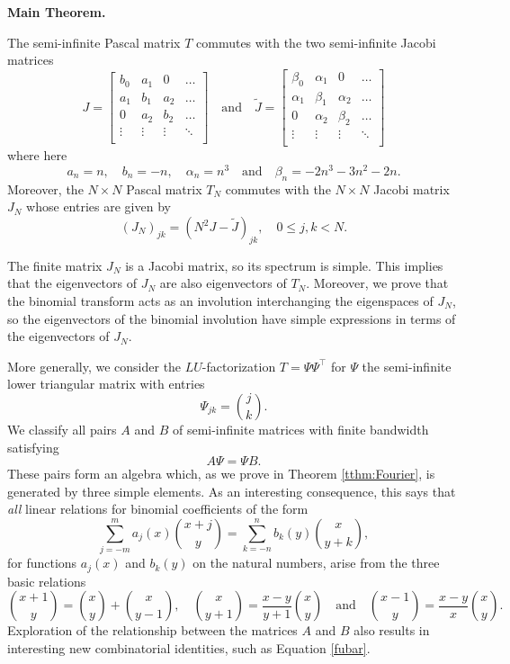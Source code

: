 \documentclass[11pt]{amsart}
\theoremstyle{plain}
\theoremstyle{named}
\def \wt {\widetilde}
\begin{document}
\smallskip

\noindent
{\bf{Main Theorem.}} {\em{
The semi-infinite Pascal matrix $T$ commutes with the two semi-infinite Jacobi matrices
$$
J = \left[\begin{array}{ccccc}
b_0 & a_1 &  0  & \dots \\
a_1 & b_1 & a_2 & \dots \\
 0  & a_2 & b_2 & \dots \\
\vdots & \vdots & \vdots & \ddots\\
\end{array}\right]
\quad\text{and}\quad
\wt J = \left[\begin{array}{cccc}
\beta_0 & \alpha_1 &  0  & \dots\\
\alpha_1 & \beta_1 & \alpha_2 & \dots\\
 0  & \alpha_2 & \beta_2 & \dots\\
\vdots & \vdots & \vdots & \ddots\\
\end{array}\right]
$$
where here
$$a_n = n,\quad b_n = -n,\quad \alpha_n = n^3\quad\text{and}\quad \beta_n = -2n^3-3n^2-2n.$$
Moreover, the $N\times N$ Pascal matrix $T_N$ commutes with the $N\times N$ Jacobi matrix $J_N$ whose entries are given by
$$(J_N)_{jk} = (N^2J - \wt J)_{jk},\quad 0\leq j,k < N.$$

}}
\medskip
The finite matrix $J_N$ is a Jacobi matrix, so its spectrum is simple.
This implies that the eigenvectors of $J_N$ are also eigenvectors of $T_N$.
Moreover, we prove that the binomial transform acts as an involution interchanging the eigenspaces of $J_N$, so the eigenvectors of the  binomial involution have simple expressions in terms of the eigenvectors of $J_N$.

More generally, we consider the $LU$-factorization $T = \Psi\Psi^\intercal$ for $\Psi$ the semi-infinite lower triangular matrix with entries 
$$\Psi_{jk} = \binom{j}{k}.$$
We classify all pairs $A$ and $B$ of semi-infinite matrices with finite bandwidth satisfying
$$A\Psi = \Psi B.$$
These pairs form an algebra which, as we prove in Theorem \ref{tthm:Fourier}, is generated by three simple elements.
As an interesting consequence, this says that \emph{all} linear relations for binomial coefficients of the form
$$\sum_{j=-m}^m a_j(x)\binom{x+j}{y} = \sum_{k=-n}^n b_k(y)\binom{x}{y+k},$$
for functions $a_j(x)$ and $b_k(y)$ on the natural numbers,
arise from the three basic relations
$$\binom{x+1}{y} = \binom{x}{y}+\binom{x}{y-1}
,\quad \binom{x}{y+1} = \frac{x-y}{y+1}\binom{x}{y}\quad\text{and}\quad\binom{x-1}{y} = \frac{x-y}{x}\binom{x}{y}.$$
Exploration of the relationship between the matrices $A$ and $B$ also results in interesting new combinatorial identities, such as Equation \eqref{fubar}.
\end{document}
